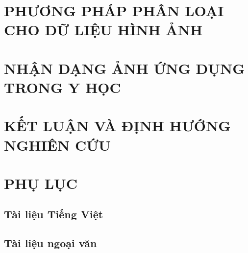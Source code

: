 \documentclass[a4paper,oneside]{report}			%
\theoremstyle{plain}
\theoremstyle{plain}
\theoremstyle{nonumberplain}
\begin{document}
\chapter[PHƯƠNG PHÁP PHÂN LOẠI CHO DỮ LIỆU HÌNH ẢNH]{PHƯƠNG PHÁP PHÂN LOẠI \\CHO DỮ LIỆU HÌNH ẢNH}
	

\chapter{NHẬN DẠNG ẢNH ỨNG DỤNG TRONG Y HỌC}
	

\chapter{KẾT LUẬN VÀ ĐỊNH HƯỚNG NGHIÊN CỨU}
	

\chapter{PHỤ LỤC}\label{phuluc}


\begin{thebibliography}{10}
	
	\section*{Tài liệu Tiếng Việt}

	\section*{Tài liệu ngoại văn}	

\end{thebibliography}

\printindex
\end{document}
